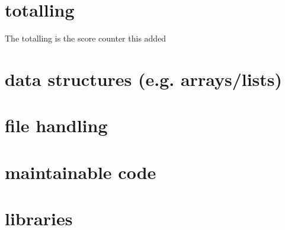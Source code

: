 \documentclass{article}
\begin{document}
\section{totalling}
The totalling is the score counter this added 

\section{data structures (e.g. arrays/lists)}


\section{file handling}


\section{maintainable code}


\section{libraries}
\end{document}
